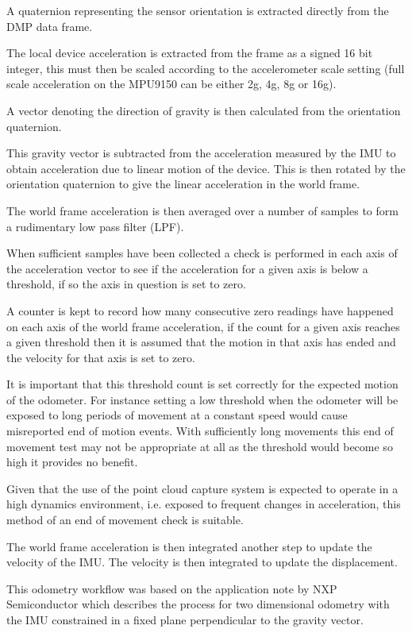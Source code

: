 \documentclass{entcs}
\begin{document}
A quaternion representing the sensor orientation is extracted directly from the
DMP data frame.

The local device acceleration is extracted from the frame as a signed 16 bit
integer, this must then be scaled according to the accelerometer scale setting
(full scale acceleration on the MPU9150 can be either 2g, 4g, 8g or 16g).

A vector denoting the direction of gravity is then calculated from the
orientation quaternion.

This gravity vector is subtracted from the acceleration measured by the IMU to
obtain acceleration due to linear motion of the device. This is then rotated by
the orientation quaternion to give the linear acceleration in the world frame.

The world frame acceleration is then averaged over a number of samples to form a
rudimentary low pass filter (LPF).

When sufficient samples have been collected a check is performed in each axis of
the acceleration vector to see if the acceleration for a given axis is below a
threshold, if so the axis in question is set to zero.

A counter is kept to record how many consecutive zero readings have happened on
each axis of the world frame acceleration, if the count for a given axis reaches
a given threshold then it is assumed that the motion in that axis has ended and
the velocity for that axis is set to zero.

It is important that this threshold count is set correctly for the expected
motion of the odometer. For instance setting a low threshold when the odometer
will be exposed to long periods of movement at a constant speed would cause
misreported end of motion events. With sufficiently long movements this end of
movement test may not be appropriate at all as the threshold would become so
high it provides no benefit.

Given that the use of the point cloud capture system is expected to operate in a
high dynamics environment, i.e. exposed to frequent changes in acceleration,
this method of an end of movement check is suitable.

The world frame acceleration is then integrated another step to update the
velocity of the IMU. The velocity is then integrated to update the displacement.

This odometry workflow was based on the application note by NXP Semiconductor
\cite{NXP_AppNote_AN3397} which describes the process for two dimensional
odometry with the IMU constrained in a fixed plane perpendicular to the gravity
vector.
\end{document}
